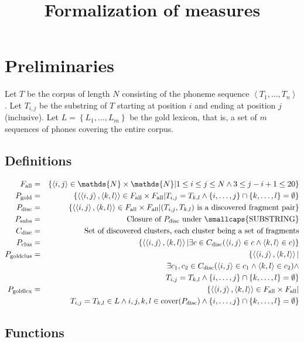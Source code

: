 \documentclass{article}
\title{Formalization of measures}
\author{}
\date{}
\newcommand{\tuple}[1]{\left \langle #1\right\rangle}
\newcommand{\set}[1]{\left\{#1\right\}}
\begin{document}
\maketitle

\LARGE

\section{Preliminaries}

Let $T$ be the corpus of length $N$ consisting of the phoneme sequence $\tuple{T_1,\ldots, T_n}$. Let $T_{i,j}$ be the substring of $T$ starting at position $i$ and ending at position $j$ (inclusive). Let $L=\set{L_1, \ldots, L_m}$ be the gold lexicon, that is, a set of $m$ sequences of phones covering the entire corpus.

\subsection{Definitions}

\begin{eqnarray*}
F_{\textrm{all}} &= &\set{\tuple{i,j} \in\mathds{N}\times\mathds{N} | 1\leq i\leq j\leq N \wedge 3\leq j-i+1\leq 20}\\
P_{\textrm{gold}} &= &\set{\tuple{\tuple{i,j},\tuple{k,l}}\in F_{\textrm{all}}\times F_{\textrm{all}} | T_{i,j}=T_{k,l} \wedge \set{i,\ldots,j}\cap\set{k,\ldots,l}=\emptyset}\\
P_{\textrm{disc}} &= &\set{\tuple{\tuple{i,j}, \tuple{k,l}} \in F_{\textrm{all}}\times F_{\textrm{all}} | (T_{i,j}, T_{k,l}) \textrm{ is a discovered fragment pair}}\\
P_{\textrm{subs}} &= &\textrm{Closure of $P_{\textrm{disc}}$ under \smallcaps{SUBSTRING}}\\
C_{\textrm{disc}} &= &\textrm{Set of discovered clusters, each cluster being a set of fragments}\\
P_{\textrm{clus}} &= &\set{\tuple{\tuple{i,j},\tuple{k,l}} | \exists c \in C_{\textrm{disc}} (\tuple{i,j}\in c \wedge \tuple{k,l}\in c)}\\
P_{\textrm{goldclus}} &= &\{\tuple{\tuple{i,j},\tuple{k,l}} | \\
& &\exists c_1, c_2 \in C_{\textrm{disc}} (\tuple{i,j}\in c_1 \wedge \tuple{k,l}\in c_2) \wedge\\
& &T_{i,j}=T_{k,l} \wedge \set{i, \ldots, j}\cap\set{k, \ldots, l}=\emptyset \}\\
 P_{\textrm{goldlex}} &= &\{\tuple{\tuple{i,j}, \tuple{k,l}}\in F_{\textrm{all}}\times F_{\textrm{all}} | \\
& &T_{i,j}=T_{k,l}\in L \wedge i,j,k,l\in\textrm{cover}(P_{\textrm{disc}})\wedge \set{i,\ldots,j}\cap\set{k,\ldots,l}=\emptyset\}
\end{eqnarray*}

\subsection{Functions}
\end{document}
